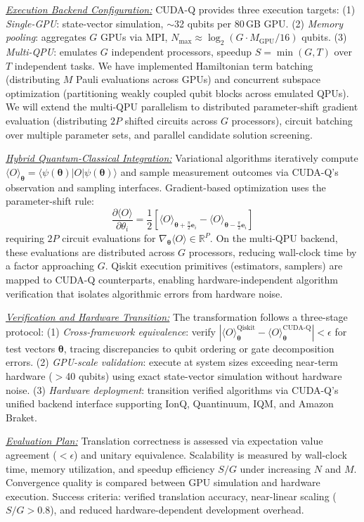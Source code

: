 \underline{\textit{Execution Backend Configuration:}}
CUDA-Q provides three execution targets: (1) \textit{Single-GPU}: state-vector simulation, $\sim$32 qubits per 80\,GB GPU. (2) \textit{Memory pooling}: aggregates $G$ GPUs via MPI, $N_{\max} \approx \log_2(G \cdot M_{\text{GPU}} / 16)$ qubits. (3) \textit{Multi-QPU}: emulates $G$ independent processors, speedup $S = \min(G, T)$ over $T$ independent tasks. We have implemented Hamiltonian term batching (distributing $M$ Pauli evaluations across GPUs) and concurrent subspace optimization (partitioning weakly coupled qubit blocks across emulated QPUs). We will extend the multi-QPU parallelism to distributed parameter-shift gradient evaluation (distributing $2P$ shifted circuits across $G$ processors), circuit batching over multiple parameter sets, and parallel candidate solution screening.

\underline{\textit{Hybrid Quantum-Classical Integration:}}
Variational algorithms iteratively compute $\langle O \rangle_{\boldsymbol{\theta}} = \langle \psi(\boldsymbol{\theta}) | O | \psi(\boldsymbol{\theta}) \rangle$ and sample measurement outcomes via CUDA-Q's observation and sampling interfaces. Gradient-based optimization uses the parameter-shift rule:
\begin{equation}
\frac{\partial \langle O \rangle}{\partial \theta_i} = \frac{1}{2} \left[ \langle O \rangle_{\boldsymbol{\theta} + \frac{\pi}{2}\mathbf{e}_i} - \langle O \rangle_{\boldsymbol{\theta} - \frac{\pi}{2}\mathbf{e}_i} \right]
\end{equation}
requiring $2P$ circuit evaluations for $\nabla_{\boldsymbol{\theta}} \langle O \rangle \in \mathbb{R}^P$. On the multi-QPU backend, these evaluations are distributed across $G$ processors, reducing wall-clock time by a factor approaching $G$. Qiskit execution primitives (estimators, samplers) are mapped to CUDA-Q counterparts, enabling hardware-independent algorithm verification that isolates algorithmic errors from hardware noise.

\underline{\textit{Verification and Hardware Transition:}}
The transformation follows a three-stage protocol: (1) \textit{Cross-framework equivalence}: verify $\left| \langle O \rangle^{\text{Qiskit}}_{\boldsymbol{\theta}} - \langle O \rangle^{\text{CUDA-Q}}_{\boldsymbol{\theta}} \right| < \epsilon$ for test vectors $\boldsymbol{\theta}$, tracing discrepancies to qubit ordering or gate decomposition errors. (2) \textit{GPU-scale validation}: execute at system sizes exceeding near-term hardware ($>$40 qubits) using exact state-vector simulation without hardware noise. (3) \textit{Hardware deployment}: transition verified algorithms via CUDA-Q's unified backend interface supporting IonQ, Quantinuum, IQM, and Amazon Braket.

\underline{\textit{Evaluation Plan:}}
Translation correctness is assessed via expectation value agreement ($<\epsilon$) and unitary equivalence. Scalability is measured by wall-clock time, memory utilization, and speedup efficiency $S/G$ under increasing $N$ and $M$. Convergence quality is compared between GPU simulation and hardware execution. Success criteria: verified translation accuracy, near-linear scaling ($S/G > 0.8$), and reduced hardware-dependent development overhead.
